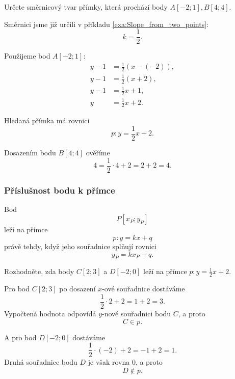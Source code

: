\begin{example}\label{exa:Slope_intercept_line_from_two_points}
    Určete směrnicový tvar přímky, která prochází body $A[-2;1], B[4;4]$.

    Směrnici jsme již určili v příkladu
    \ref{exa:Slope_from_two_points}:
    \[
        k=\frac{1}{2}.
    \]

    Použijeme bod $A[-2;1]$:
    \begin{align*}
        y-1
        &=
        \frac{1}{2}(x-(-2)),\\
        y-1
        &=
        \frac{1}{2}(x+2),\\
        y-1
        &=
        \frac{1}{2}x+1,\\
        y
        &=
        \frac{1}{2}x+2.
    \end{align*}

    Hledaná přímka má rovnici
    \[
        p:y=\frac{1}{2}x+2.
    \]

    Dosazením bodu $B[4;4]$ ověříme
    \[
        4
        =
        \frac{1}{2}\cdot4+2
        =
        2+2
        =
        4.
    \]
\end{example}

\subsubsection{Příslušnost bodu k přímce}
\label{subsubsec:Point_on_slope_intercept_line}

Bod
\[
    P[x_P;y_P]
\]
leží na přímce
\[
    p:y=kx+q
\]
právě tehdy, když jeho souřadnice splňují rovnici
\begin{equation}\label{eq:Point_on_slope_intercept_line}
    y_P=kx_P+q.
\end{equation}

\begin{example}\label{exa:Points_on_slope_intercept_line}
    Rozhodněte, zda body $C[2;3]$ a $D[-2;0]$ leží na přímce $p:y=\frac{1}{2}x+2$.

    Pro bod $C[2;3]$ po dosazení $x$-ové souřadnice dostáváme
    \[
        \frac{1}{2}\cdot2+2
        =
        1+2
        =
        3.
    \]
    Vypočtená hodnota odpovídá $y$-nové souřadnici bodu $C$, a proto
    \[
        C\in p.
    \]

    A pro bod $D[-2;0]$ dostáváme
    \[
        \frac{1}{2}\cdot(-2)+2
        =
        -1+2
        =
        1.
    \]
    Druhá souřadnice bodu $D$ je však rovna $0$, a proto
    \[
        D\notin p.
    \]
\end{example}

